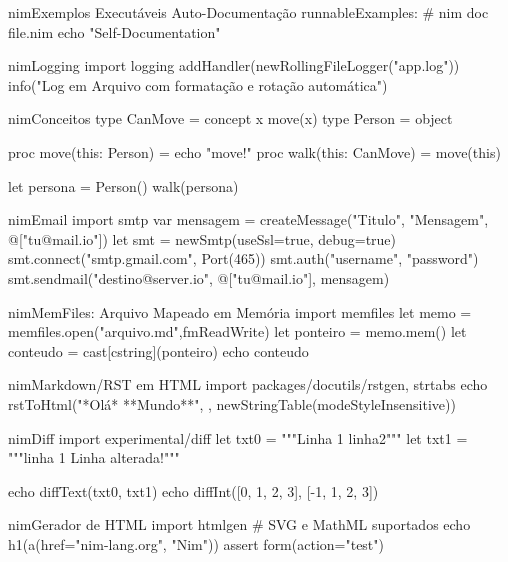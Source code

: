 \documentclass[10pt, a4paper]{article}
\begin{document}
\begin{multicols}{4}
\begin{codebox}{nim}{Exemplos Executáveis Auto-Documentação}
runnableExamples: # nim doc file.nim
  echo "Self-Documentation"
\end{codebox}


\begin{codebox}{nim}{Logging}
import logging
addHandler(newRollingFileLogger("app.log"))
info("Log em Arquivo com formatação e rotação automática")
\end{codebox}


\begin{codebox}{nim}{Conceitos}
type CanMove = concept x
  move(x)
type Person = object

proc move(this: Person) = echo "move!"
proc walk(this: CanMove) = move(this)

let persona = Person()
walk(persona)
\end{codebox}


\begin{codebox}{nim}{Email}
import smtp
var mensagem = createMessage("Titulo", "Mensagem",  @["tu@mail.io"])
let smt = newSmtp(useSsl=true, debug=true)
smt.connect("smtp.gmail.com", Port(465))
smt.auth("username", "password")
smt.sendmail("destino@server.io", @["tu@mail.io"], mensagem)
\end{codebox}


\begin{codebox}{nim}{MemFiles: Arquivo Mapeado em Memória}
import memfiles
let memo = memfiles.open("arquivo.md",fmReadWrite)
let ponteiro = memo.mem()
let conteudo = cast[cstring](ponteiro)
echo conteudo
\end{codebox}


\begin{codebox}{nim}{Markdown/RST em HTML}
import packages/docutils/rstgen, strtabs
echo rstToHtml("*Olá* **Mundo**", {}, newStringTable(modeStyleInsensitive))
\end{codebox}


\begin{codebox}{nim}{Diff}
import experimental/diff
let txt0 = """Linha 1
linha2"""
let txt1 = """linha 1
Linha alterada!"""

echo diffText(txt0, txt1)
echo diffInt([0, 1, 2, 3], [-1, 1, 2, 3])
\end{codebox}


\begin{codebox}{nim}{Gerador de HTML}
import htmlgen # SVG e MathML suportados
echo h1(a(href="nim-lang.org", "Nim"))
assert form(action="test")
\end{codebox}



\end{multicols}
\end{document}
